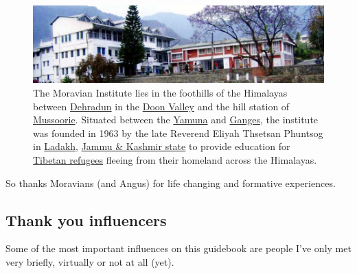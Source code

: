 \documentclass[
]{book}
\begin{document}
\begin{figure}

{\centering \includegraphics[width=1\linewidth]{images/moravian-insitute} 

}

\caption{The Moravian Institute lies in the foothills of the Himalayas between \href{https://en.wikipedia.org/wiki/Dehradun}{Dehradun} in the \href{https://en.wikipedia.org/wiki/Doon_Valley}{Doon Valley} and the hill station of \href{https://en.wikipedia.org/wiki/Mussoorie}{Mussoorie}. Situated between the \href{https://en.wikipedia.org/wiki/Yamuna}{Yamuna} and \href{https://en.wikipedia.org/wiki/Ganges}{Ganges}, the institute was founded in 1963 by the late Reverend Eliyah Thsetsan Phuntsog in \href{https://en.wikipedia.org/wiki/Ladakh}{Ladakh}, \href{https://en.wikipedia.org/wiki/Jammu_and_Kashmir_(state)}{Jammu \& Kashmir state} to provide education for \href{https://en.wikipedia.org/wiki/Tibetan_diaspora}{Tibetan refugees} fleeing from their homeland across the Himalayas.}\label{fig:moravian-fig}
\end{figure}



So thanks Moravians (and Angus) for life changing and formative experiences. 🙏

\hypertarget{influences}{%
\subsection{Thank you influencers}\label{influences}}

Some of the most important influences on this guidebook are people I've only met very briefly, virtually or not at all (yet).
\end{document}

